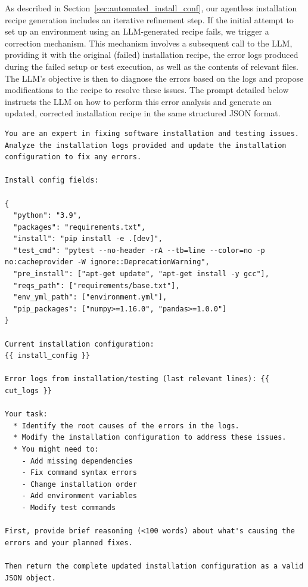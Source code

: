 \documentclass[dandb]{article}
\begin{document}
As described in Section~\ref{sec:automated_install_conf}, our agentless installation recipe generation includes an iterative refinement step. If the initial attempt to set up an environment using an LLM-generated recipe fails, we trigger a correction mechanism. This mechanism involves a subsequent call to the LLM, providing it with the original (failed) installation recipe, the error logs produced during the failed setup or test execution, as well as the contents of relevant files. The LLM's objective is then to diagnose the errors based on the logs and propose modifications to the recipe to resolve these issues. The prompt detailed below instructs the LLM on how to perform this error analysis and generate an updated, corrected installation recipe in the same structured JSON format.

\label{sec:update_install_recipe}

\begin{lstlisting}[upquote=true,caption=LLM prompt for updating installation recipe]
You are an expert in fixing software installation and testing issues. Analyze the installation logs provided and update the installation configuration to fix any errors.

Install config fields:

{
  "python": "3.9",
  "packages": "requirements.txt",
  "install": "pip install -e .[dev]",
  "test_cmd": "pytest --no-header -rA --tb=line --color=no -p no:cacheprovider -W ignore::DeprecationWarning",
  "pre_install": ["apt-get update", "apt-get install -y gcc"],
  "reqs_path": ["requirements/base.txt"],
  "env_yml_path": ["environment.yml"],
  "pip_packages": ["numpy>=1.16.0", "pandas>=1.0.0"]
}

Current installation configuration:
{{ install_config }}

Error logs from installation/testing (last relevant lines): {{ cut_logs }}

Your task:
  * Identify the root causes of the errors in the logs.
  * Modify the installation configuration to address these issues.
  * You might need to:
    - Add missing dependencies
    - Fix command syntax errors
    - Change installation order
    - Add environment variables
    - Modify test commands

First, provide brief reasoning (<100 words) about what's causing the errors and your planned fixes.

Then return the complete updated installation configuration as a valid JSON object.
\end{lstlisting}
\end{document}
